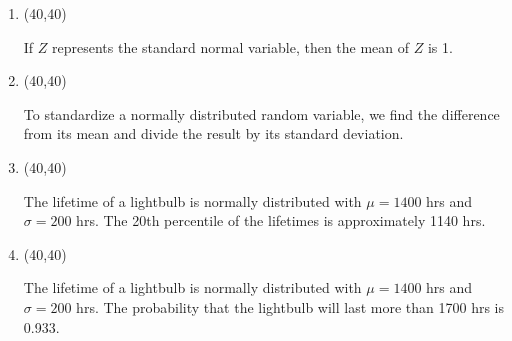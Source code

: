 \documentclass[11pt,twoside]{article}
\numberwithin{equation}{section}
\newcommand{\?}{\stackrel{?}{=}}
\newcommand{\gr}{\color{green!40!black}}
\begin{document}
\begin{enumerate}[\bf (i)]
\item \hfill
  \begin{minipage}{.1\linewidth}
    \framebox(40,40){ \gr  }
  \end{minipage}\quad
  \begin{minipage}{.85\linewidth}
    If $Z$ represents the standard normal variable, then the mean of $Z$ is 1.
   \end{minipage}
  
  \smallskip
  
\item \hfill
  \begin{minipage}{.1\linewidth}
    \framebox(40,40){\gr }
  \end{minipage}\quad
  \begin{minipage}{.85\linewidth}
    To standardize a normally distributed random variable, we find the difference from its mean and divide the result by
    its standard deviation.   
  \end{minipage}

  \smallskip
  
\item \hfill
  \begin{minipage}{.1\linewidth}
    \framebox(40,40){\gr  }
  \end{minipage}\quad
  \begin{minipage}{.85\linewidth}
    The lifetime of a lightbulb is normally distributed with $\mu=1400$ hrs and $\sigma=200$ hrs.
    The 20th percentile of the lifetimes is approximately 1140 hrs.
   \end{minipage}

  \smallskip
  
\item \hfill
  \begin{minipage}{.1\linewidth}
    \framebox(40,40){\gr  }
  \end{minipage}\quad
  \begin{minipage}{.85\linewidth}
    The lifetime of a lightbulb is normally distributed with $\mu=1400$ hrs and $\sigma=200$ hrs.
    The probability that the lightbulb will last more than 1700 hrs is 0.933.
  \end{minipage}

  \smallskip

  

\end{enumerate}
\end{document}
